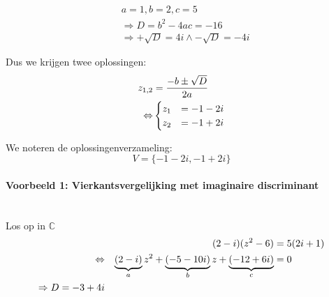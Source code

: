 \documentclass[12pt,twoside]{article}
\begin{document}
\begin{align*}
  & a=1, b=2, c=5\\
  & \Rightarrow  D = b^2 - 4ac = -16\\
  & \Rightarrow  +\sqrt{D} = 4i \wedge -\sqrt{D}=-4i
\end{align*}

Dus we krijgen twee oplossingen:
\begin{align*}
  z_{1,2} &= \dfrac{-b \pm \sqrt{D}}{2a}\\
  \Leftrightarrow & \begin{cases}z_1 &= -1 - 2i\\z_2 &= -1 + 2i\end{cases}
\end{align*}

We noteren de oplossingenverzameling:
$$V=\{ -1-2i, -1+2i \}$$

\paragraph*{Voorbeeld 1: Vierkantsvergelijking met imaginaire discriminant}\mbox{}\\
Los op in $\mathbb{C}$
\begin{align*}
       && (2-i)(z^2-6) &= 5(2i+1)\\
  \Leftrightarrow && \underbrace{(2-i)}_a z^2 + \underbrace{(-5-10i)}_b z + \underbrace{(-12+6i)}_c &= 0\\
  \Rightarrow D = -3+4i
\end{align*}
\end{document}
